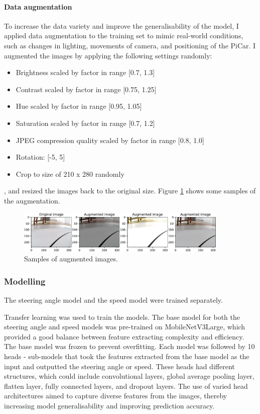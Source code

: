 \documentclass{article}
\begin{document}
\paragraph{Data augmentation}
To increase the data variety and improve the generalisability of the model, I applied data augmentation to the training set to mimic real-world conditions, such as changes in lighting, movements of camera, and positioning of the PiCar. I augmented the images by applying the following settings randomly:
\begin{itemize}
  \item Brightness scaled by factor in range [0.7, 1.3]
  \item Contrast scaled by factor in range [0.75, 1.25]
  \item Hue scaled by factor in range [0.95, 1.05]
  \item Saturation scaled by factor in range [0.7, 1.2]
  \item JPEG compression quality scaled by factor in range [0.8, 1.0]
  \item Rotation: [-5\textdegree, 5\textdegree]
  \item Crop to size of 210 x 280 randomly
\end{itemize}
, and resized the images back to the original size. Figure \ref{fig:augmentation} shows some samples of the augmentation.

\begin{figure}[h]
  \centering
  \includegraphics[width=0.9\textwidth]{figures/augmentation.pdf}
  \caption{Samples of augmented images.}
  \label{fig:augmentation}
\end{figure}

\subsubsection{Modelling}
The steering angle model and the speed model were trained separately.

Transfer learning was used to train the models. The base model for both the steering angle and speed models was pre-trained on MobileNetV3Large, which provided a good balance between feature extracting complexity and efficiency. The base model was frozen to prevent overfitting. Each model was followed by 10 heads - sub-models that took the features extracted from the base model as the input and outputted the steering angle or speed. These heads had different structures, which could include convolutional layers, global average pooling layer, flatten layer, fully connected layers, and dropout layers. The use of varied head architectures aimed to capture diverse features from the images, thereby increasing model generalisability and improving prediction accuracy.
\end{document}
